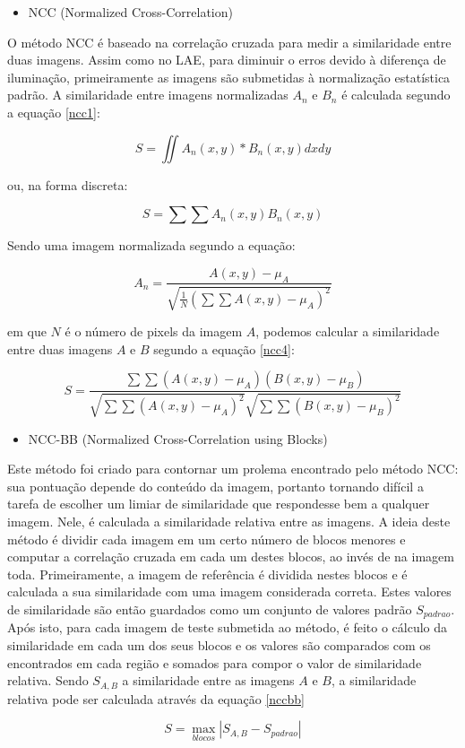 \begin{itemize}
\item NCC (Normalized Cross-Correlation)
\end{itemize}

O método NCC é baseado na correlação cruzada para medir a similaridade entre duas imagens. Assim como no LAE, para diminuir o erros devido à diferença de iluminação, primeiramente as imagens são submetidas à normalização estatística padrão. A similaridade entre imagens normalizadas $A_n$ e $B_n$ é calculada segundo a equação \ref{ncc1}:

\begin{equation}
S = \iint A_n(x,y)*B_n(x,y) dx dy \label{ncc1} 
\end{equation}

ou, na forma discreta:

\begin{equation}
S = \sum \sum A_n(x,y)B_n(x,y) \label{ncc2} 
\end{equation} 


Sendo uma imagem normalizada segundo a equação:

\begin{equation}
A_n = \frac {A(x,y) - \mu_A}{\sqrt {\frac{1}{N}(\sum \sum {A(x,y)-\mu_A})^2}} \label{ncc3} 
\end{equation} 

em que $N$ é o número de pixels da imagem $A$, podemos calcular a similaridade entre duas imagens $A$ e $B$ segundo a equação \ref{ncc4}:

\begin{equation}
S = \frac{\sum \sum (A(x,y)-\mu _A)(B(x,y)-\mu _B)}{\sqrt{\sum \sum (A(x,y)-\mu _A)^2}\sqrt{\sum \sum (B(x,y)-\mu _B)^2}}
\label{ncc4}
\end{equation}

\begin{itemize}
\item NCC-BB (Normalized Cross-Correlation using Blocks)
\end{itemize}

Este método foi criado para contornar um prolema encontrado pelo método NCC: sua pontuação depende do conteúdo da imagem, portanto tornando difícil a tarefa de escolher um limiar de similaridade que respondesse bem a qualquer imagem. Nele, é calculada a similaridade relativa entre as imagens.
A ideia deste método é dividir cada imagem em um certo número de blocos menores e computar a correlação cruzada em cada um destes blocos, ao invés de na imagem toda. Primeiramente, a imagem de referência é dividida nestes blocos e é calculada a sua similaridade com uma imagem considerada correta. Estes valores de similaridade são então guardados como um conjunto de valores padrão $S_{padrao}$.
Após isto, para cada imagem de teste submetida ao método, é feito o cálculo da similaridade em cada um dos seus blocos e os valores são comparados com os encontrados em cada região e somados para compor o valor de similaridade relativa. Sendo $S_{A,B}$ a similaridade entre as imagens $A$ e $B$, a similaridade relativa pode ser calculada através da equação \ref{nccbb}

\begin{equation}
S = \max_{blocos}|S_{A,B} - S_{padrao}| \label{nccbb}
\end{equation}